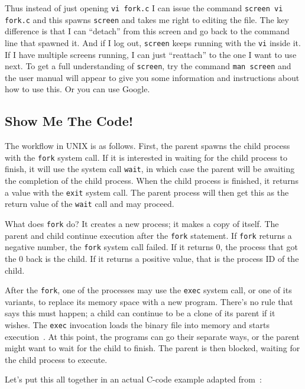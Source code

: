 Thus instead of just opening \texttt{vi fork.c} I can issue the command \texttt{screen vi fork.c} and this spawns \texttt{screen} and takes me right to editing the file. The key difference is that I can ``detach'' from this screen and go back to the command line that spawned it. And if I log out, \texttt{screen} keeps running with the \texttt{vi} inside it. If I have multiple screens running, I can just ``reattach'' to the one I want to use next. To get a full understanding of \texttt{screen}, try the command \texttt{man screen} and the user manual will appear to give you some information and instructions about how to use this. Or you can use Google.


\subsection*{Show Me The Code!}

The workflow in UNIX is as follows. First, the parent spawns the child process with the \texttt{fork} system call. If it is interested in waiting for the child process to finish, it will use the system call \texttt{wait}, in which case the parent will be awaiting the completion of the child process. When the child process is finished, it returns a value with the \texttt{exit} system call. The parent process will then get this as the return value of the \texttt{wait} call and may proceed.

What does \texttt{fork} do? It creates a new process; it makes a copy of itself. The parent and child continue execution after the \texttt{fork} statement. If \texttt{fork} returns a negative number, the \texttt{fork} system call failed. If it returns 0, the process that got the 0 back is the child. If it returns a positive value, that is the process ID of the child.

After the \texttt{fork}, one of the processes may use the \texttt{exec} system call, or one of its variants, to replace its memory space with a new program. There's no rule that says this must happen; a child can continue to be a clone of its parent if it wishes. The \texttt{exec} invocation loads the binary file into memory and starts execution~\cite{osc}. At this point, the programs can go their separate ways, or the parent might want to wait for the child to finish. The parent is then blocked, waiting for the child process to execute.

Let's put this all together in an actual C-code example adapted from~\cite{osc}:

